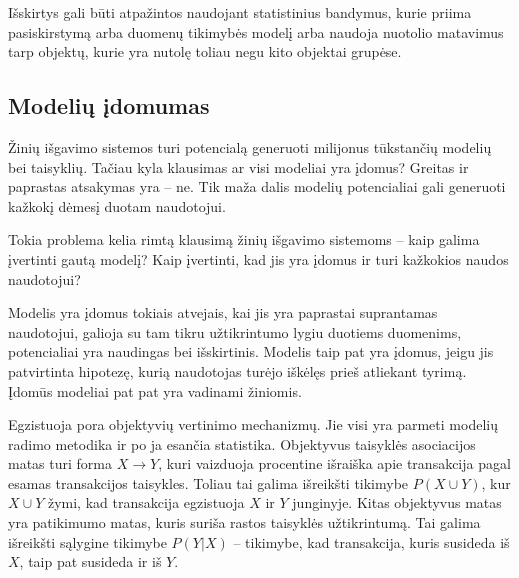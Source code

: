 Išskirtys gali būti atpažintos naudojant statistinius bandymus, kurie priima pasiskirstymą arba duomenų tikimybės modelį arba naudoja nuotolio matavimus tarp objektų, kurie yra nutolę toliau negu kito objektai grupėse.

\subsection{Modelių įdomumas}

Žinių išgavimo sistemos turi potencialą generuoti milijonus tūkstančių modelių bei taisyklių.
Tačiau kyla klausimas ar visi modeliai yra įdomus? Greitas ir paprastas atsakymas yra -- ne.
Tik maža dalis modelių potencialiai gali generuoti kažkokį dėmesį duotam naudotojui.

Tokia problema kelia rimtą klausimą žinių išgavimo sistemoms -- kaip galima įvertinti gautą modelį? Kaip įvertinti, kad jis yra įdomus ir turi kažkokios naudos naudotojui?

Modelis yra įdomus tokiais atvejais, kai jis yra paprastai suprantamas naudotojui, galioja su tam tikru užtikrintumo lygiu duotiems duomenims, potencialiai yra naudingas bei išskirtinis.
Modelis taip pat yra įdomus, jeigu jis patvirtinta hipotezę, kurią naudotojas turėjo iškėlęs prieš atliekant tyrimą. 
Įdomūs modeliai pat pat yra vadinami žiniomis.

Egzistuoja pora objektyvių vertinimo mechanizmų.
Jie visi yra parmeti modelių radimo metodika ir po ja esančia statistika.
Objektyvus taisyklės asociacijos matas turi forma $ X \rightarrow Y$, kuri vaizduoja procentine išraiška apie transakcija pagal esamas transakcijos taisykles.
Toliau tai galima išreikšti tikimybe $P(X \cup Y)$, kur $X \cup Y$ žymi, kad transakcija egzistuoja $X$ ir $Y$ junginyje.
Kitas objektyvus matas yra patikimumo matas, kuris suriša rastos taisyklės užtikrintumą.
Tai galima išreikšti sąlygine tikimybe $P(Y|X)$ -- tikimybe, kad transakcija, kuris susideda iš $X$, taip pat susideda ir iš $Y$.

